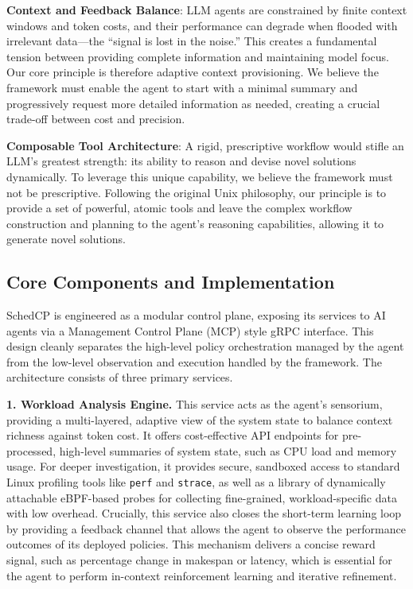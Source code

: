 \textbf{Context and Feedback Balance}: LLM agents are constrained by finite context windows and token costs, and their performance can degrade when flooded with irrelevant data—the ``signal is lost in the noise.'' This creates a fundamental tension between providing complete information and maintaining model focus. Our core principle is therefore adaptive context provisioning. We believe the framework must enable the agent to start with a minimal summary and progressively request more detailed information as needed, creating a crucial trade-off between cost and precision.

\textbf{Composable Tool Architecture}: A rigid, prescriptive workflow would stifle an LLM's greatest strength: its ability to reason and devise novel solutions dynamically. To leverage this unique capability, we believe the framework must not be prescriptive. Following the original Unix philosophy, our principle is to provide a set of powerful, atomic tools and leave the complex workflow construction and planning to the agent's reasoning capabilities, allowing it to generate novel solutions.

\subsection{Core Components and Implementation}
SchedCP is engineered as a modular control plane, exposing its services to AI agents via a Management Control Plane (MCP) style gRPC interface. This design cleanly separates the high-level policy orchestration managed by the agent from the low-level observation and execution handled by the framework. The architecture consists of three primary services.

\textbf{1. Workload Analysis Engine.} This service acts as the agent's sensorium, providing a multi-layered, adaptive view of the system state to balance context richness against token cost. It offers cost-effective API endpoints for pre-processed, high-level summaries of system state, such as CPU load and memory usage. For deeper investigation, it provides secure, sandboxed access to standard Linux profiling tools like \texttt{perf} and \texttt{strace}, as well as a library of dynamically attachable eBPF-based probes for collecting fine-grained, workload-specific data with low overhead. Crucially, this service also closes the short-term learning loop by providing a feedback channel that allows the agent to observe the performance outcomes of its deployed policies. This mechanism delivers a concise reward signal, such as percentage change in makespan or latency, which is essential for the agent to perform in-context reinforcement learning and iterative refinement.

